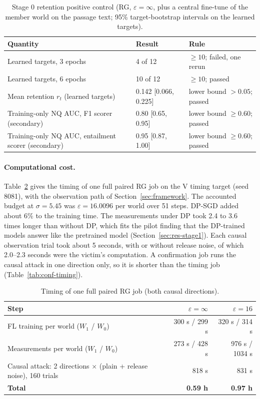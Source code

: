 \documentclass[11pt]{article}
\begin{document}
\begin{table}[htbp]
\centering
\caption{Stage 0 retention positive control (RG, $\varepsilon=\infty$, plus a central fine-tune of the member world on the passage text; 95\% target-bootstrap intervals on the learned targets).}\label{tab:control}
\small
\begin{tabular}{@{}lll@{}}
\toprule
Quantity & Result & Rule \\
\midrule
Learned targets, 3 epochs & 4 of 12 & $\geq 10$; failed, one rerun \\
Learned targets, 6 epochs & 10 of 12 & $\geq 10$; passed \\
Mean retention $r_t$ (learned targets) & 0.142 [0.066, 0.225] & lower bound $>0.05$; passed \\
Training-only NQ AUC, F1 scorer (secondary) & 0.80 [0.65, 0.95] & lower bound $\geq 0.60$; passed \\
Training-only NQ AUC, entailment scorer (secondary) & 0.95 [0.87, 1.00] & lower bound $\geq 0.60$; passed \\
\bottomrule
\end{tabular}
\end{table}

\paragraph{Computational cost.} Table~\ref{tab:timing} gives the timing of one full paired RG job on the V timing target (seed 8081), with the observation path of Section~\ref{sec:framework}. The accounted budget at $\sigma=5.45$ was $\varepsilon=16.0096$ per world over 51 steps. DP-SGD added about 6\% to the training time. The measurements under DP took 2.4 to 3.6 times longer than without DP, which fits the pilot finding that the DP-trained models answer like the pretrained model (Section~\ref{sec:res-stage1}). Each causal observation trial took about 5 seconds, with or without release noise, of which 2.0--2.3 seconds were the victim's computation. A confirmation job runs the causal attack in one direction only, so it is shorter than the timing job (Table~\ref{tab:conf-timing}).

\begin{table}[htbp]
\centering
\caption{Timing of one full paired RG job (both causal directions).}\label{tab:timing}
\small
\begin{tabular}{@{}lrr@{}}
\toprule
Step & $\varepsilon=\infty$ & $\varepsilon=16$ \\
\midrule
FL training per world ($W_1$ / $W_0$) & 300 s / 299 s & 320 s / 314 s \\
Measurements per world ($W_1$ / $W_0$) & 273 s / 428 s & 976 s / 1034 s \\
Causal attack: 2 directions $\times$ (plain + release noise), 160 trials & 818 s & 831 s \\
\textbf{Total} & \textbf{0.59 h} & \textbf{0.97 h} \\
\bottomrule
\end{tabular}
\end{table}
\end{document}
